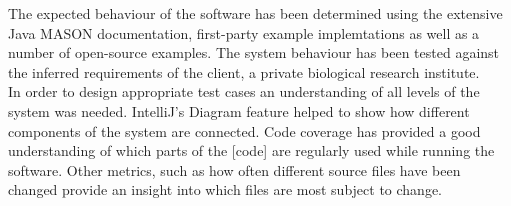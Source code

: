 \documentclass[11pt]{article}
\begin{document}
The expected behaviour of the software has been determined using the extensive Java MASON documentation\cite{mason_doc}, first-party example implemtations as well as a number of open-source examples\cite{ppsim}.
The system behaviour has been tested against the inferred requirements of the client, a private biological research institute.
\\

In order to design appropriate test cases an understanding of all levels of the system was needed.
IntelliJ's Diagram feature helped to show how different components of the system are connected.
Code coverage has provided a good understanding of which parts of the [code] are regularly used while running the software.
Other metrics, such as how often different source files have been changed provide an insight into which files are most subject to change.


\end{document}

